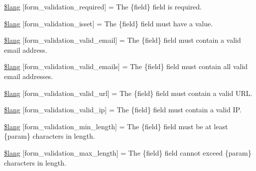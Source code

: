 \begin{DoxyCompactItemize}
\item 
\mbox{\hyperlink{form__validation__lang_8php_a7c6b74d48acd188829365b6db579aa56}{\$lang}} \mbox{[}\textquotesingle{}form\+\_\+validation\+\_\+required\textquotesingle{}\mbox{]} = \textquotesingle{}The \{field\} field is required.\textquotesingle{}
\item 
\mbox{\hyperlink{form__validation__lang_8php_a6ae716d42d07e49ae48e06d0e9d9843a}{\$lang}} \mbox{[}\textquotesingle{}form\+\_\+validation\+\_\+isset\textquotesingle{}\mbox{]} = \textquotesingle{}The \{field\} field must have a value.\textquotesingle{}
\item 
\mbox{\hyperlink{form__validation__lang_8php_a20ebb5d6430eda30d97f673364274dd8}{\$lang}} \mbox{[}\textquotesingle{}form\+\_\+validation\+\_\+valid\+\_\+email\textquotesingle{}\mbox{]} = \textquotesingle{}The \{field\} field must contain a valid email address.\textquotesingle{}
\item 
\mbox{\hyperlink{form__validation__lang_8php_ae09639726ac794f66bb9fdef490cfd84}{\$lang}} \mbox{[}\textquotesingle{}form\+\_\+validation\+\_\+valid\+\_\+emails\textquotesingle{}\mbox{]} = \textquotesingle{}The \{field\} field must contain all valid email addresses.\textquotesingle{}
\item 
\mbox{\hyperlink{form__validation__lang_8php_a7b1558f69e002c2ef22c7ee3b11fdbbb}{\$lang}} \mbox{[}\textquotesingle{}form\+\_\+validation\+\_\+valid\+\_\+url\textquotesingle{}\mbox{]} = \textquotesingle{}The \{field\} field must contain a valid U\+R\+L.\textquotesingle{}
\item 
\mbox{\hyperlink{form__validation__lang_8php_a1a11ad1b087a43f55547dbf5f538ce6e}{\$lang}} \mbox{[}\textquotesingle{}form\+\_\+validation\+\_\+valid\+\_\+ip\textquotesingle{}\mbox{]} = \textquotesingle{}The \{field\} field must contain a valid I\+P.\textquotesingle{}
\item 
\mbox{\hyperlink{form__validation__lang_8php_a252fb8841eee58dd9ee9541c192ada2d}{\$lang}} \mbox{[}\textquotesingle{}form\+\_\+validation\+\_\+min\+\_\+length\textquotesingle{}\mbox{]} = \textquotesingle{}The \{field\} field must be at least \{param\} characters in length.\textquotesingle{}
\item 
\mbox{\hyperlink{form__validation__lang_8php_acb1f5fa772e61a5ee9c619744b2e8b4d}{\$lang}} \mbox{[}\textquotesingle{}form\+\_\+validation\+\_\+max\+\_\+length\textquotesingle{}\mbox{]} = \textquotesingle{}The \{field\} field cannot exceed \{param\} characters in length.\textquotesingle{}

\end{DoxyCompactItemize}
